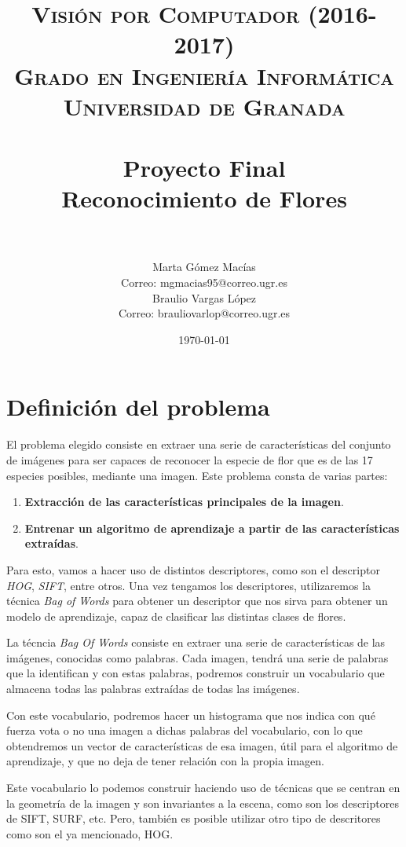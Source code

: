 \documentclass[paper=a4, fontsize=11pt]{article} %
\title{
\normalfont \normalsize
\textsc{{\bf Visión por Computador (2016-2017)} \\ Grado en Ingeniería Informática \\ Universidad de Granada} \\ [25pt] %
\horrule{0.5pt} \\[0.4cm] %
\huge Proyecto Final\\Reconocimiento de Flores\\%
\horrule{2pt} \\[0.5cm] %
}
\author{Marta Gómez Macías\\Correo: mgmacias95@correo.ugr.es\\
Braulio Vargas López\\Correo: brauliovarlop@correo.ugr.es} %
\date{\normalsize\today} %
\numberwithin{equation}{section} %
\numberwithin{figure}{section} %
\numberwithin{table}{section} %
\begin{document}
\maketitle %
\newpage %

\tableofcontents %
\newpage
{}

\section{Definición del problema}

El problema elegido consiste en extraer una serie de características del conjunto de imágenes para ser capaces de reconocer la especie de flor que es de las 17 especies posibles, mediante una imagen. Este problema consta de varias partes:

\begin{enumerate}
    \item \textbf{Extracción de las características principales de la imagen}.
    \item \textbf{Entrenar un algoritmo de aprendizaje a partir de las características extraídas}.
\end{enumerate}

Para esto, vamos a hacer uso de distintos descriptores, como son el descriptor \textit{HOG}, \textit{SIFT}, entre otros. Una vez tengamos los descriptores, utilizaremos la técnica \textit{Bag of Words} para obtener un descriptor que nos sirva para obtener un modelo de aprendizaje, capaz de clasificar las distintas clases de flores.

La técncia \textit{Bag Of Words} consiste en extraer una serie de características de las imágenes, conocidas como palabras. Cada imagen, tendrá una serie de palabras que la identifican y con estas palabras, podremos construir un vocabulario que almacena todas las palabras extraídas de todas las imágenes.

Con este vocabulario, podremos hacer un histograma que nos indica con qué fuerza vota o no una imagen a dichas palabras del vocabulario, con lo que obtendremos un vector de características de esa imagen, útil para el algoritmo de aprendizaje, y que no deja de tener relación con la propia imagen.

Este vocabulario lo podemos construir haciendo uso de técnicas que se centran en la geometría de la imagen y son invariantes a la escena, como son los descriptores de SIFT, SURF, etc. Pero, también es posible utilizar otro tipo de descritores como son el ya mencionado, HOG.
\end{document}
